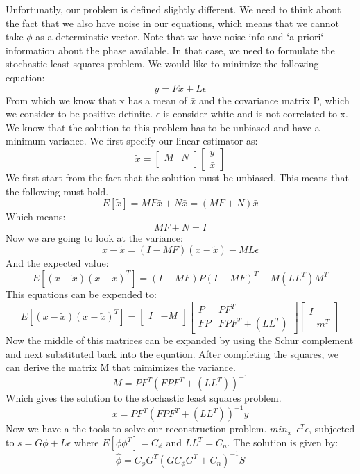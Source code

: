 \documentclass{article}
\begin{document}
Unfortunatly, our problem is defined slightly different. We need to think about the fact that we also have noise in our equations, which means that we cannot take $\phi$ as a determinstic vector. Note that we have noise info and `a priori` information about the phase available. In that case, we need to formulate the stochastic least squares problem. We would like to minimize the following equation:
$$ y=Fx+L\epsilon$$
From which we know that x has a mean of $\bar{x}$ and the covariance matrix P, which we consider to be positive-definite.
$\epsilon$ is consider white and is not correlated to x. We know that the solution to this problem has to be unbiased and have a minimum-variance. We first specify our linear estimator as:
$$ \tilde{x} = 
\begin{bmatrix}
M & N \\
\end{bmatrix}
\begin{bmatrix}
y \\
\bar{x}
\end{bmatrix}
$$
We first start from the fact that the solution must be unbiased. This means that the following must hold.
$$ E[\tilde{x}]=MF\bar{x} + N\bar{x}=(MF+N)\bar{x}$$
Which means:
$$MF+N=I$$  
Now we are going to look at the variance:
$$x-\tilde{x}=(I-MF)(x-\tilde{x})-ML\epsilon$$
And the expected value:
$$ E[(x-\tilde{x})(x-\tilde{x})^T] = (I-MF)P(I-MF)^T - M(LL^T)M^T$$
This equations can be expended to:
$$ E[(x-\tilde{x})(x-\tilde{x})^T] =
\begin{bmatrix}
I & -M \\
\end{bmatrix}
\begin{bmatrix}
P  & PF^T \\
FP & FPF^T+(LL^T)
\end{bmatrix}
\begin{bmatrix}
I  \\
-m^T
\end{bmatrix}
$$ 
Now the middle of this matrices can be expanded by using the Schur complement and next substituted back into the equation. After completing the squares, we can derive the matrix M that mimimizes the variance.
$$ M = PF^T(FPF^T+(LL^T))^{-1}$$
Which gives the solution to the stochastic least squares problem.
$$\tilde{x} = PF^T(FPF^T+(LL^T))^{-1}y$$
Now we have a the tools to solve our reconstruction problem.
\newline
\newline
$ min_x \ \ \epsilon^T \epsilon $, subjected to $ s=G\phi + L\epsilon$
\newline
\newline
where $E[\phi\phi^T]=C_\phi$ and $LL^T=C_n$. The solution is given by:
$$\hat{\phi} = C_\phi G^T(GC_\phi G^T + C_n)^{-1}S $$
\end{document}
